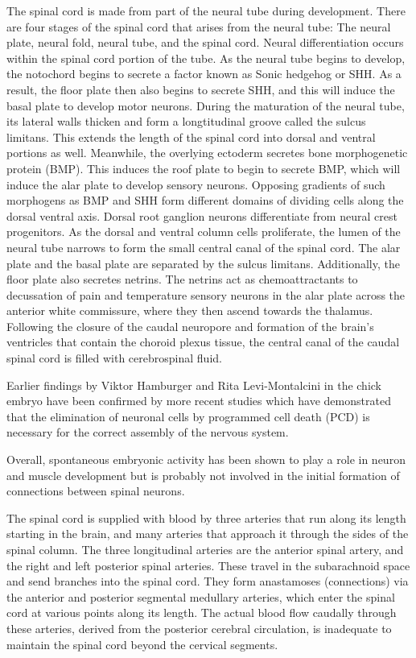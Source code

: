 The spinal cord is made from part of the neural tube during development. There are four stages of the spinal cord that arises from the neural tube: The neural plate, neural fold, neural tube, and the spinal cord. Neural differentiation occurs within the spinal cord portion of the tube. As the neural tube begins to develop, the notochord begins to secrete a factor known as Sonic hedgehog or SHH. As a result, the floor plate then also begins to secrete SHH, and this will induce the basal plate to develop motor neurons. During the maturation of the neural tube, its lateral walls thicken and form a longtitudinal groove called the sulcus limitans. This extends the length of the spinal cord into dorsal and ventral portions as well. Meanwhile, the overlying ectoderm secretes bone morphogenetic protein (BMP). This induces the roof plate to begin to secrete BMP, which will induce the alar plate to develop sensory neurons. Opposing gradients of such morphogens as BMP and SHH form different domains of dividing cells along the dorsal ventral axis. Dorsal root ganglion neurons differentiate from neural crest progenitors. As the dorsal and ventral column cells proliferate, the lumen of the neural tube narrows to form the small central canal of the spinal cord. The alar plate and the basal plate are separated by the sulcus limitans. Additionally, the floor plate also secretes netrins. The netrins act as chemoattractants to decussation of pain and temperature sensory neurons in the alar plate across the anterior white commissure, where they then ascend towards the thalamus. Following the closure of the caudal neuropore and formation of the brain's ventricles that contain the choroid plexus tissue, the central canal of the caudal spinal cord is filled with cerebrospinal fluid.

Earlier findings by Viktor Hamburger and Rita Levi-Montalcini in the chick embryo have been confirmed by more recent studies which have demonstrated that the elimination of neuronal cells by programmed cell death (PCD) is necessary for the correct assembly of the nervous system.

Overall, spontaneous embryonic activity has been shown to play a role in neuron and muscle development but is probably not involved in the initial formation of connections between spinal neurons.

The spinal cord is supplied with blood by three arteries that run along its length starting in the brain, and many arteries that approach it through the sides of the spinal column. The three longitudinal arteries are the anterior spinal artery, and the right and left posterior spinal arteries. These travel in the subarachnoid space and send branches into the spinal cord. They form anastamoses (connections) via the anterior and posterior segmental medullary arteries, which enter the spinal cord at various points along its length. The actual blood flow caudally through these arteries, derived from the posterior cerebral circulation, is inadequate to maintain the spinal cord beyond the cervical segments.

